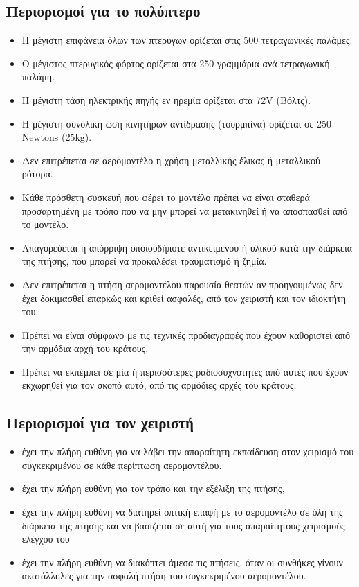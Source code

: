 \documentclass[a4paper, 12pt, twoside]{report}
\begin{document}
{{{{{{		\subsection{Περιορισμοί για το πολύπτερο}			
			\begin{itemize}
				\item Η μέγιστη επιφάνεια όλων των πτερύγων ορίζεται
στις 500 τετραγωνικές παλάμες.
				\item Ο μέγιστος πτερυγικός φόρτος ορίζεται στα 250
γραμμάρια ανά τετραγωνική παλάμη.
				\item Η μέγιστη τάση ηλεκτρικής πηγής εν ηρεμία ορίζεται στα 72V (Βόλτς).
				\item Η μέγιστη συνολική ώση κινητήρων αντίδρασης
(τουρμπίνα) ορίζεται σε 250 Newtons (25kg).
				\item Δεν επιτρέπεται σε αερομοντέλο η χρήση μεταλλικής έλικας ή μεταλλικού ρότορα.
				\item Κάθε πρόσθετη συσκευή που φέρει το μοντέλο πρέπει να είναι σταθερά προσαρτημένη με τρόπο που να μην μπορεί να μετακινηθεί ή να αποσπασθεί από το μοντέλο.
				\item Απαγορεύεται η απόρριψη οποιουδήποτε αντικειμένου ή υλικού κατά την διάρκεια της πτήσης, που μπορεί να προκαλέσει τραυματισμό ή ζημία.
				\item Δεν επιτρέπεται η πτήση αερομοντέλου παρουσία θεατών αν προηγουμένως δεν έχει δοκιμασθεί επαρκώς και κριθεί ασφαλές, από τον χειριστή και τον ιδιοκτήτη του.
				\item Πρέπει να είναι σύμφωνο με τις τεχνικές προδιαγραφές
που έχουν καθοριστεί από την αρμόδια αρχή του κράτους.
				\item Πρέπει να εκπέμπει σε μία ή περισσότερες ραδιοσυχνότητες από αυτές που έχουν εκχωρηθεί για τον σκοπό αυτό, από τις αρμόδιες αρχές του κράτους.
			\end{itemize}
			
		\subsection{Περιορισμοί για τον χειριστή}			
			\begin{itemize}
				\item έχει την πλήρη ευθύνη για να λάβει την απαραίτητη εκπαίδευση στον χειρισμό του συγκεκριμένου σε κάθε περίπτωση αερομοντέλου.
				\item έχει την πλήρη ευθύνη για τον τρόπο και την εξέλιξη της πτήσης,
				\item έχει την πλήρη ευθύνη να διατηρεί οπτική επαφή με το αερομοντέλο σε όλη της διάρκεια της πτήσης και να βασίζεται σε αυτή για τους απαραίτητους χειρισμούς ελέγχου του
				\item έχει την πλήρη ευθύνη να διακόπτει άμεσα τις πτήσεις, όταν οι συνθήκες γίνουν ακατάλληλες για την ασφαλή πτήση του συγκεκριμένου αερομοντέλου.
			\end{itemize}
			
}}}}}}
\end{document}
